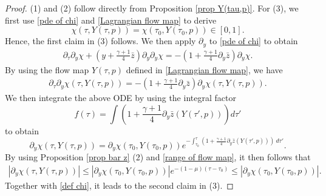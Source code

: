 \documentclass{article}
\newcommand{\ga}{\gamma}
\newcommand{\pa}{\partial}
\def\be{\begin{equation}}
\def\ee{\end{equation}}
\numberwithin{equation}{section}
\begin{document}
\begin{proof}
	(1) and (2) follow directly from Proposition \ref{prop Y(tau,p)}. 
    For (3), %
    we first use \eqref{pde of chi} and \eqref{Lagrangian flow map} to derive
	\[
		\chi(\tau,Y(\tau,p)) = \chi(\tau_0,Y(\tau_0,p)) \in[0,1].
	\]
	Hence, the first claim in (3) follows. 
	 We then apply $\pa_y$ to \eqref{pde of chi} to obtain
	\begin{align*}
		\pa_\tau \pa_y\chi+(y+\frac{\ga+1}{4}\bar z )\pa_y \pa_y\chi = -(1+\frac{\ga+1}{4}\pa_y \bar z) \pa_y\chi.
	\end{align*}
	By using the flow map $Y(\tau,p)$ defined in \eqref{Lagrangian flow map}, we have 
	\begin{align*}
		\pa_\tau \pa_y\chi(\tau,Y(\tau,p))= -(1+\frac{\ga+1}{4}\pa_y \bar z) \pa_y\chi(\tau,Y(\tau,p)).
	\end{align*}
	We then integrate the above ODE by using the integral factor 
	\be \label{def IF}
	f(\tau) = \int (1+\frac{\ga+1}{4}\pa_y \bar z (Y(\tau',p) )) d\tau' 
	\ee 
	to obtain
	\be\label{pa_y chi}
		\pa_y\chi(\tau,Y(\tau,p)) = \pa_y\chi(\tau_0,Y(\tau_0,p)) e^{-\int_{\tau_0}^\tau (1+\frac{\ga+1}{4}\pa_y \bar z(Y(\tau',p)))\ d\tau'}.
	\ee
    By using Proposition \ref{prop bar z} (2) and \eqref{range of flow map}, it then follows that
	\begin{align*}
		|\pa_y\chi(\tau,Y(\tau,p))| \leq |\pa_y\chi(\tau_0,Y(\tau_0,p))| e^{-(1-\mu)(\tau-\tau_0)} \leq |\pa_y\chi(\tau_0,Y(\tau_0,p))|.
	\end{align*}
	Together with \eqref{def chi}, it leads to the second claim in (3).  
    

\end{proof}
\end{document}
